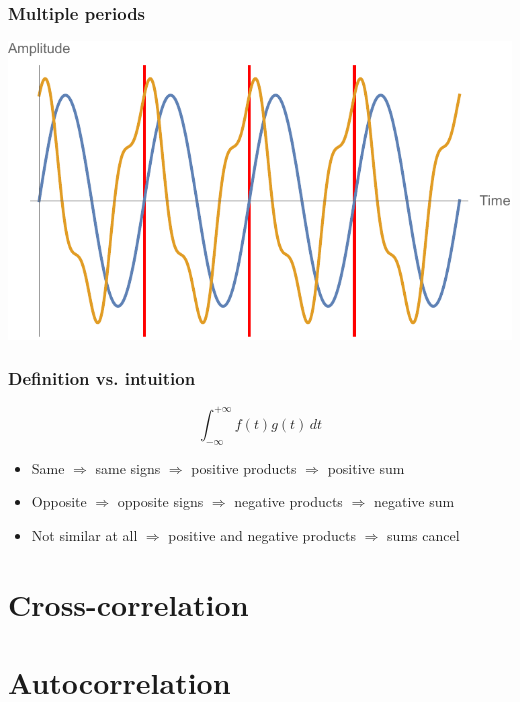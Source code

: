 \documentclass{beamer}
\begin{document}
\begin{frame}
  \frametitle{Multiple periods}

  \centering
  \includegraphics[width=\textwidth * 3 / 4]{7 multiple periods.pdf}

\end{frame}

\begin{frame}
  \frametitle{Definition vs. intuition}

  \[\int_{-\infty}^{+\infty} f(t) g(t) \,dt\]

  \begin{itemize}
    \item<2-> Same $\Rightarrow$ same signs $\Rightarrow$ positive products $\Rightarrow$ positive sum
    \item<3-> Opposite $\Rightarrow$ opposite signs $\Rightarrow$ negative products $\Rightarrow$ negative sum
    \item<4-> Not similar at all $\Rightarrow$ positive and negative products $\Rightarrow$ sums cancel
  \end{itemize}
\end{frame}

\section{Cross-correlation}

\section{Autocorrelation}
\end{document}
